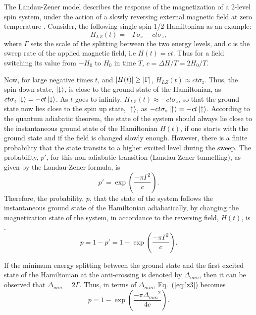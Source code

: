 \documentclass[../main.tex]{subfiles}
\begin{document}
The Landau-Zener model describes the response of the magnetization of a 2-level spin system, under the action of a slowly reversing external magnetic field at zero temperature \cite{landau1932theorie,zener1932non,de1997theory}. Consider, the following single spin-1/2 Hamiltonian as an example:
\begin{equation}
H_{LZ}(t)=-\Gamma \sigma_x -c t \sigma_z, \label{eq:lz1}
\end{equation}
where $\Gamma$ sets the scale of the splitting between the two energy levels, and $c$ is the sweep rate of the applied magnetic field, i.e $H(t)=ct$. Thus for a field switching its value from $-H_0$ to $H_0$ in time $T$, $c=\Delta H/T= 2H_0/T$.

Now, for large negative times $t$, and $\abs{H(t)} \geq \abs{\Gamma}$, $H_{LZ}(t)\approx ct \sigma_z$. Thus, the spin-down state, $\ket{\downarrow}$, is close to the ground state of the Hamiltonian, as $ct \sigma_z \ket{\downarrow}=-ct \ket{\downarrow}$. As $t$ goes to infinity, $H_{LZ}(t)\approx -ct \sigma_z$, so that the ground state now lies close to the spin up state, $\ket{\uparrow}$, as $-ct \sigma_z \ket{\uparrow}=-ct \ket{\uparrow}$. According to the quantum adiabatic theorem, the state of the system should always lie close to the instantaneous ground state of the Hamiltonian $H(t)$, if one starts with the ground state and if the field is changed slowly enough. However, there is a finite probability that the state transits to a higher excited level during the sweep. The probability, $p'$, for this non-adiabatic transition (Landau-Zener tunnelling), as given by the Landau-Zener formula, is
\begin{equation}
p'=\exp(\frac{-\pi {\Gamma}^2}{c}) . 
\end{equation}
Therefore, the probability, $p$, that the state of the system follows the instantaneous ground state of the Hamiltonian adiabatically, by changing the magnetization state of the system, in accordance to the reversing field, $H(t)$, is \cite{landau1932theorie,zener1932non,de1997theory,miyashita1995dynamics}.
\begin{equation}
p=1-p'=1-\exp(\frac{-\pi {\Gamma}^2}{c}) .   \label{eq:lz2}
\end{equation}

If the minimum energy splitting between the ground state and the first excited state of the Hamiltonian at the anti-crossing is denoted by $\Delta_{min}$, then it can be observed that $\Delta_{min}= 2 \Gamma$. Thus, in terms of $\Delta_{min}$, Eq.~(\ref{eq:lz3}) becomes 
\begin{equation}
p=1-\exp(\frac{-\pi {\Delta_{min}}^2}{4c}) .   \label{eq:lz3}
\end{equation}
\end{document}
